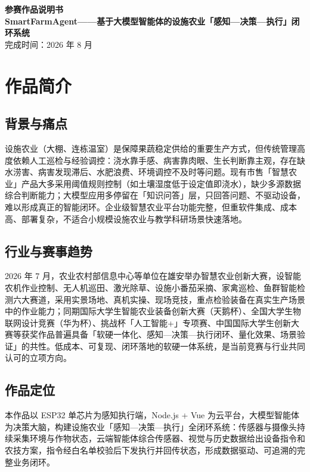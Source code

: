 ﻿\documentclass[11pt]{ctexart}
\begin{document}
\begin{center}
  {\LARGE\bfseries 参赛作品说明书}\\[8pt]
  {\large\bfseries SmartFarmAgent——基于大模型智能体的设施农业「感知—决策—执行」闭环系统}\\[4pt]
  {\normalsize 完成时间：2026 年 8 月}
\end{center}

\vspace{1.2em}

\section{作品简介}
\subsection{背景与痛点}
设施农业（大棚、连栋温室）是保障果蔬稳定供给的重要生产方式，但传统管理高度依赖人工巡检与经验调控：浇水靠手感、病害靠肉眼、生长判断靠主观，存在缺水涝害、病害发现滞后、水肥浪费、环境调控不及时等问题。现有市售「智慧农业」产品大多采用阈值规则控制（如土壤湿度低于设定值即浇水），缺少多源数据综合判断能力；大模型应用多停留在「知识问答」层，只回答问题、不驱动设备，难以形成真正的智能闭环。企业级智慧农业平台功能完整，但重软件集成、成本高、部署复杂，不适合小规模设施农业与教学科研场景快速落地。

\subsection{行业与赛事趋势}
2026 年 7 月，农业农村部信息中心等单位在雄安举办智慧农业创新大赛，设智能农机作业控制、无人机巡田、激光除草、设施小番茄采摘、家禽巡检、鱼群智能检测六大赛道，采用实景场地、真机实操、现场竞技，重点检验装备在真实生产场景中的作业能力；同期国际大学生智能农业装备创新大赛（天鹅杯）、全国大学生物联网设计竞赛（华为杯）、挑战杯「人工智能+」专项赛、中国国际大学生创新大赛等获奖作品普遍具备「软硬一体化、感知—决策—执行闭环、量化效果、场景验证」的共性。低成本、可复现、闭环落地的软硬一体系统，是当前竞赛与行业共同认可的立项方向。

\subsection{作品定位}
本作品以 ESP32 单芯片为感知执行端，Node.js + Vue 为云平台，大模型智能体为决策大脑，构建设施农业「感知—决策—执行」全闭环系统：传感器与摄像头持续采集环境与作物状态，云端智能体综合传感器、视觉与历史数据给出设备指令和农技方案，指令经白名单校验后下发执行并回传状态，形成数据驱动、可追溯的完整业务闭环。
\end{document}
